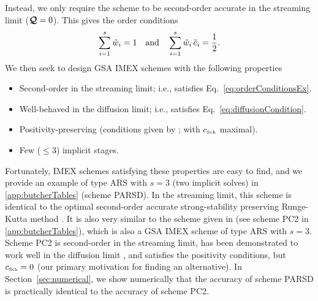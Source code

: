 Instead, we only require the scheme to be second-order accurate in the streaming limit ($\boldsymbol{\mathcal{Q}}=0$).  
This gives the order conditions
\begin{equation}
  \sum_{i=1}^{s}\tilde{w}_{i}=1
  \quad\text{and}\quad
  \sum_{i=1}^{s}\tilde{w}_{i}\,\tilde{c}_{i}=\frac{1}{2}.  
  \label{eq:orderConditionsEx}
\end{equation}
We then seek to design GSA IMEX schemes with the following properties
\begin{itemize}
  \item Second-order in the streaming limit; i.e., satisfies Eq.~\eqref{eq:orderConditionsEx}.
  \item Well-behaved in the diffusion limit; i.e., satisfies Eq.~\eqref{eq:diffusionCondition}.
  \item Positivity-preserving (conditions given by \cite{hu_etal_2017}; with $c_{\mbox{\tiny Sch}}$ maximal).
  \item Few ($\le3$) implicit stages.
\end{itemize}
Fortunately, IMEX schemes satisfying these properties are easy to find, and we provide an example of type ARS with $s=3$ (two implicit solves) in \ref{app:butcherTables} (scheme PARSD).  
In the streaming limit, this scheme is identical to the optimal second-order accurate strong-stability preserving Runge-Kutta method \cite{gottlieb_etal_2001}.  
It is also very similar to the scheme given in \cite{mcclareen_2008} (see scheme PC2 in \ref{app:butcherTables}), which is also a GSA IMEX scheme of type ARS with $s=3$.  
Scheme PC2 is second-order in the streaming limit, has been demonstrated to work well in the diffusion limit \cite{mcclareen_2008,radice_etal_2013}, and satisfies the positivity conditions, but $c_{\mbox{\tiny Sch}}=0$ (our primary motivation for finding an alternative).  
In Section~\ref{sec:numerical}, we show numerically that the accuracy of scheme PARSD is practically identical to the accuracy of scheme PC2.  